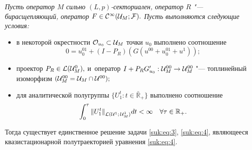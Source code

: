 \begin{theorem}[2]{\it Пусть  оператор  $M$  сильно $(L,p)$-секториален, оператор $R$  "---  бирасщепляющий, оператор $F \in {\cal C}^ \infty ({\cal U}_M;{\cal F}).$  
Пусть выполняются следующие условия:
\begin{itemize}
\item[${\rm (A1)} $] в некоторой окрестности ${\cal O}_{u_0} \subset {\cal U}_M$ точки $u_0$ выполнено соотношение
\begin{equation}
0=u^{01}_0+(I-P_R)(G(u^{00}+u_0^{01}+u^1)); 
\label{suk:eq:8}
\end{equation}

\item[${\rm   (A2)} $] проектор $P_R \in {\cal L} ({\cal U}_M^0),$ и~оператор $I+P_RG'_{u_0}:{\cal U}_M^{00} \to {\cal U}_M^{00}$  "--- 
топлинейный изоморфизм $( {\cal U}_M^{00}={\cal U}_M \cap {\cal U}^{00});$

\item[{\rm (A3)}] для аналитической полугруппы $\{ U^t_1:t \in \bar {\mathbb R}_{+} \}$ выполнено соотношение
\begin{equation}
\int_0^{\tau} {\| U_1^t \|}_{{\cal L}({\cal U}^1;\,{\cal U}_M^1)} dt< \infty
\quad \forall \tau \in {\mathbb R}_{+}. 
\label{suk:eq:9}
\end{equation}
\end{itemize}

Тогда   существует  единственное   решение   задачи  \eqref{suk:eq:3}, \eqref{suk:eq:4}, являющееся квазистационарной полутраекторией уравнения
\eqref{suk:eq:4}.}
\end{theorem}




